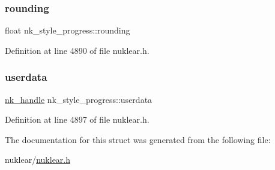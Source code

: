 \subsubsection{\texorpdfstring{rounding}{rounding}}
{\footnotesize\ttfamily float nk\+\_\+style\+\_\+progress\+::rounding}



Definition at line 4890 of file nuklear.\+h.

\mbox{\label{structnk__style__progress_af990f8b225eba54c3ad6b0137e619584}} 
\subsubsection{\texorpdfstring{userdata}{userdata}}
{\footnotesize\ttfamily \mbox{\hyperlink{unionnk__handle}{nk\+\_\+handle}} nk\+\_\+style\+\_\+progress\+::userdata}



Definition at line 4897 of file nuklear.\+h.



The documentation for this struct was generated from the following file\+:\begin{DoxyCompactItemize}
\item 
nuklear/\mbox{\hyperlink{nuklear_8h}{nuklear.\+h}}\end{DoxyCompactItemize}
